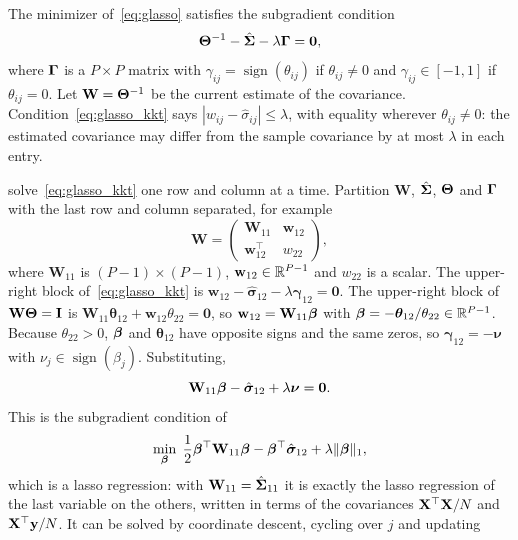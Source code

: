 The minimizer of~\eqref{eq:glasso} satisfies the subgradient condition
\begin{equation}
  \boldsymbol{\Theta}^{-1} - \hat{\boldsymbol{\Sigma}} - \lambda\boldsymbol{\Gamma} = \mathbf{0},
  \label{eq:glasso_kkt}
\end{equation}
where $\boldsymbol{\Gamma}$ is a $P\times P$ matrix with $\gamma_{ij}=\operatorname{sign}(\theta_{ij})$ if $\theta_{ij}\neq0$ and $\gamma_{ij}\in[-1,1]$ if $\theta_{ij}=0$. Let $\mathbf{W}=\boldsymbol{\Theta}^{-1}$ be the current estimate of the covariance. Condition~\eqref{eq:glasso_kkt} says $|w_{ij}-\hat\sigma_{ij}|\le\lambda$, with equality wherever $\theta_{ij}\neq0$: the estimated covariance may differ from the sample covariance by at most $\lambda$ in each entry.

\citet{friedman2008} solve~\eqref{eq:glasso_kkt} one row and column at a time. Partition $\mathbf{W}$, $\hat{\boldsymbol{\Sigma}}$, $\boldsymbol{\Theta}$ and $\boldsymbol{\Gamma}$ with the last row and column separated, for example
\begin{equation}
  \mathbf{W} = \begin{pmatrix}\mathbf{W}_{11} & \mathbf{w}_{12}\\ \mathbf{w}_{12}^\top & w_{22}\end{pmatrix},
\end{equation}
where $\mathbf{W}_{11}$ is $(P-1)\times(P-1)$, $\mathbf{w}_{12}\in\mathbb{R}^{P-1}$ and $w_{22}$ is a scalar. The upper-right block of~\eqref{eq:glasso_kkt} is $\mathbf{w}_{12}-\hat{\boldsymbol\sigma}_{12}-\lambda\boldsymbol\gamma_{12}=\mathbf{0}$. The upper-right block of $\mathbf{W}\boldsymbol{\Theta}=\mathbf{I}$ is $\mathbf{W}_{11}\boldsymbol\theta_{12}+\mathbf{w}_{12}\theta_{22}=\mathbf{0}$, so $\mathbf{w}_{12}=\mathbf{W}_{11}\boldsymbol{\beta}$ with $\boldsymbol{\beta}=-\boldsymbol\theta_{12}/\theta_{22}\in\mathbb{R}^{P-1}$. Because $\theta_{22}>0$, $\boldsymbol{\beta}$ and $\boldsymbol\theta_{12}$ have opposite signs and the same zeros, so $\boldsymbol\gamma_{12}=-\boldsymbol\nu$ with $\nu_j\in\operatorname{sign}(\beta_j)$. Substituting,
\begin{equation}
  \mathbf{W}_{11}\boldsymbol{\beta} - \hat{\boldsymbol\sigma}_{12} + \lambda\boldsymbol\nu = \mathbf{0}.
\end{equation}
This is the subgradient condition of
\begin{equation}
  \min_{\boldsymbol{\beta}}\;\frac12\boldsymbol{\beta}^\top\mathbf{W}_{11}\boldsymbol{\beta} - \boldsymbol{\beta}^\top\hat{\boldsymbol\sigma}_{12} + \lambda\|\boldsymbol{\beta}\|_1,
\end{equation}
which is a lasso regression: with $\mathbf{W}_{11}=\hat{\boldsymbol{\Sigma}}_{11}$ it is exactly the lasso regression of the last variable on the others, written in terms of the covariances $\mathbf{X}^\top\mathbf{X}/N$ and $\mathbf{X}^\top\mathbf{y}/N$. It can be solved by coordinate descent, cycling over $j$ and updating
